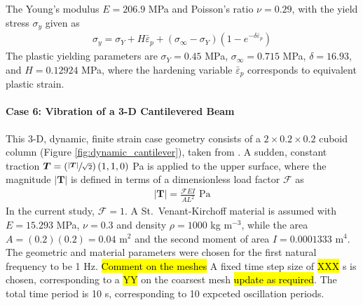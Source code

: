 \documentclass[sn-mathphys,Numbered]{sn-jnl}%
\newcommand{\bb}{\boldsymbol}
\begin{document}
The Young's modulus $E = 206.9$ MPa and Poisson's ratio $\nu=0.29$, with the yield stress $\sigma_y$ given as \citep{Simo1992}
\begin{eqnarray}
	\sigma_y = \sigma_Y + H\bar{\varepsilon}_p + (\sigma_{\infty} - \sigma_Y)(1- e^{-\delta\bar{\varepsilon}_p})
\end{eqnarray}
The plastic yielding parameters are $\sigma_Y = 0.45$ MPa, $\sigma_{\infty} = 0.715$ MPa, $\delta = 16.93$, and $H = 0.12924$ MPa, where the hardening variable $\bar{\varepsilon}_p$ corresponds to equivalent plastic strain.


\paragraph{Case 6: Vibration of a 3-D Cantilevered Beam}
This 3-D, dynamic, finite strain case geometry consists of a $2 \times 0.2 \times 0.2$ cuboid column (Figure \ref{fig:dynamic_cantilever}), taken from \citet{Tukovic2007}.
A sudden, constant traction $\bb{T} = \left(\sfrac{|\bb{T}|}{\sqrt{2}}\right) \left(1, 1, 0 \right)$ Pa is applied to the upper surface, where the magnitude $|\bb{T}|$ is defined in terms of a dimensionless load factor $\mathcal{F}$ as
\begin{eqnarray}
	|\bb{T}| = \frac{\mathcal{F} E I}{A L^2} \text{ Pa}
\end{eqnarray}
In the current study, $\mathcal{F} = 1$.
A St.\ Venant-Kirchoff material is assumed with $E = 15.293$ MPa, $\nu = 0.3$ and density $\rho = 1000$ kg m$^{-3}$, while the area $A = (0.2)(0.2) = 0.04$ m$^2$ and the second moment of area $I = 0.0001333$ m$^4$.
The geometric and material parameters were chosen for the first natural frequency to be 1 Hz.
\hl{Comment on the meshes}
A fixed time step size of \hl{XXX} s is chosen, corresponding to a \hl{YY} on the coarsest mesh \hl{update as required}.
The total time period is 10 s, corresponding to 10 expceted oscillation periods.
\end{document}
